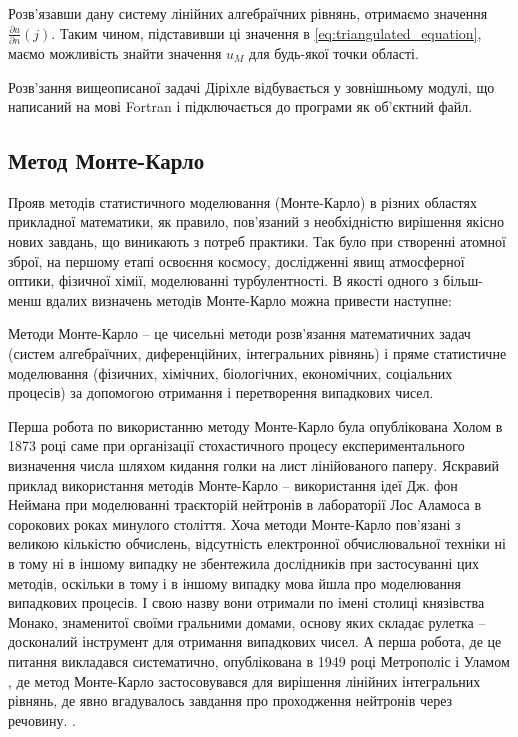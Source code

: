 \documentclass[a4paper,12pt]{article}
\begin{document}
Розв’язавши дану систему лінійних алгебраїчних рівнянь, отримаємо значення $\frac{\partial u}{\partial n}(j)$. Таким чином, підставивши ці значення в \ref{eq:triangulated_equation}, маємо можливість знайти значення $u_M$ для будь-якої точки області.

Розв’зання вищеописаної задачі Діріхле відбувається у зовнішньому модулі, що написаний на мові Fortran і підключається до програми як об’єктний файл.

\subsection{Метод Монте-Карло}
Прояв методів статистичного моделювання (Монте-Карло) в різних областях прикладної математики, як правило, пов'язаний з необхідністю вирішення якісно нових завдань, що виникають з потреб практики. Так було при створенні атомної зброї, на першому етапі освоєння космосу, дослідженні явищ атмосферної оптики, фізичної хімії, моделюванні турбулентності. В якості одного з більш-менш вдалих визначень методів Монте-Карло можна привести наступне:

Методи Монте-Карло -- це чисельні методи розв'язання математичних задач (систем алгебраїчних, диференційних, інтегральних рівнянь) і пряме статистичне моделювання (фізичних, хімічних, біологічних, економічних, соціальних процесів) за допомогою отримання і перетворення випадкових чисел.
 
Перша робота по використанню методу Монте-Карло була опублікована Холом в 1873 році саме при організації стохастичного процесу експериментального визначення числа шляхом кидання голки на лист лінійованого паперу. Яскравий приклад використання методів Монте-Карло -- використання ідеї Дж. фон Неймана при моделюванні траєкторій нейтронів в лабораторії Лос Аламоса в сорокових роках минулого століття. Хоча методи Монте-Карло пов'язані з великою кількістю обчислень, відсутність електронної обчислювальної техніки ні в тому ні в іншому випадку не збентежила дослідників при застосуванні цих методів, оскільки в тому і в іншому випадку мова йшла про моделювання випадкових процесів. І свою назву вони отримали по імені столиці князівства Монако, знаменитої своїми гральними домами, основу яких складає рулетка -- досконалий інструмент для отримання випадкових чисел. А перша робота, де це питання викладався систематично, опублікована в 1949 році Метрополіс і Уламом \cite{Metropolis}, де метод Монте-Карло застосовувався для вирішення лінійних інтегральних рівнянь, де явно вгадувалось завдання про проходження нейтронів через речовину. \cite{belocerkovskyi}.
\end{document}
